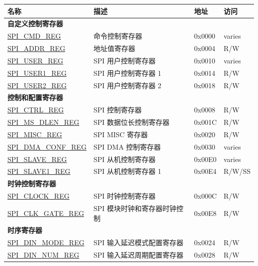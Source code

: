 \begin{longtable}{ | p{6cm} | p{6.2cm} | p{1.3cm} | p{2cm} | }
\hline\rowcolor{lightgray}
名称 & 描述 & 地址 & 访问 \\ \hline
\endhead
\multicolumn{4}{|l|}{\textbf{自定义控制寄存器}} \\ \hline
\hyperref[regdesc:SPICMDREG]{SPI\_CMD\_REG} & 命令控制寄存器 & 0x0000 & varies \\ \hline
\hyperref[regdesc:SPIADDRREG]{SPI\_ADDR\_REG} & 地址值寄存器 & 0x0004 & R/W \\ \hline
\hyperref[regdesc:SPIUSERREG]{SPI\_USER\_REG} & SPI 用户控制寄存器 & 0x0010 & varies \\ \hline
\hyperref[regdesc:SPIUSER1REG]{SPI\_USER1\_REG} & SPI 用户控制寄存器 1 & 0x0014 & R/W \\ \hline
\hyperref[regdesc:SPIUSER2REG]{SPI\_USER2\_REG} & SPI 用户控制寄存器 2 & 0x0018 & R/W \\ \hline
\multicolumn{4}{|l|}{\textbf{控制和配置寄存器}} \\ \hline
\hyperref[regdesc:SPICTRLREG]{SPI\_CTRL\_REG} & SPI 控制寄存器 & 0x0008 & R/W \\ \hline
\hyperref[regdesc:SPIMSDLENREG]{SPI\_MS\_DLEN\_REG} & SPI 数据位长控制寄存器 & 0x001C & R/W \\ \hline
\hyperref[regdesc:SPIMISCREG]{SPI\_MISC\_REG} & SPI MISC 寄存器 & 0x0020 & R/W \\ \hline
\hyperref[regdesc:SPIDMACONFREG]{SPI\_DMA\_CONF\_REG} & SPI DMA 控制寄存器 & 0x0030 & varies \\ \hline
\hyperref[regdesc:SPISLAVEREG]{SPI\_SLAVE\_REG} & SPI 从机控制寄存器 & 0x00E0 & varies \\ \hline
\hyperref[regdesc:SPISLAVE1REG]{SPI\_SLAVE1\_REG} & SPI 从机控制寄存器 1 & 0x00E4 & R/W/SS \\ \hline
\multicolumn{4}{|l|}{\textbf{时钟控制寄存器}} \\ \hline
\hyperref[regdesc:SPICLOCKREG]{SPI\_CLOCK\_REG} & SPI 时钟控制寄存器 & 0x000C & R/W \\ \hline
\hyperref[regdesc:SPICLKGATEREG]{SPI\_CLK\_GATE\_REG} & SPI 模块时钟和寄存器时钟控制 & 0x00E8 & R/W \\ \hline
\multicolumn{4}{|l|}{\textbf{时序寄存器}} \\ \hline
\hyperref[regdesc:SPIDINMODEREG]{SPI\_DIN\_MODE\_REG} & SPI 输入延迟模式配置寄存器 & 0x0024 & R/W \\ \hline
\hyperref[regdesc:SPIDINNUMREG]{SPI\_DIN\_NUM\_REG} & SPI 输入延迟周期配置寄存器 & 0x0028 & R/W \\ \hline

\end{longtable}
